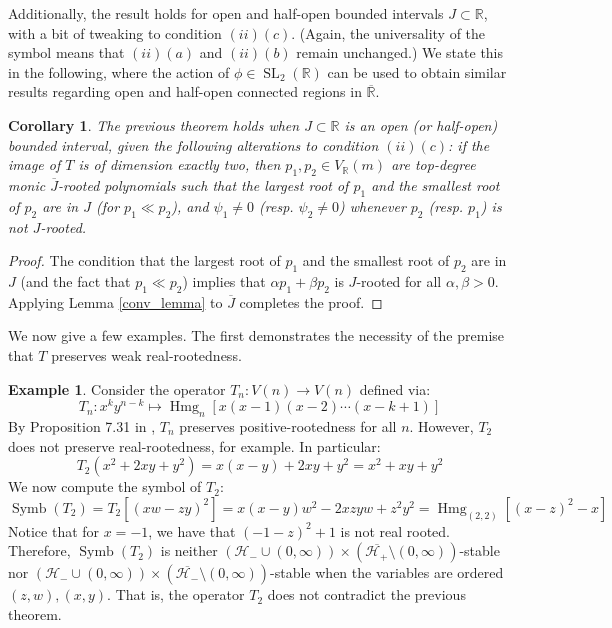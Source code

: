 \documentclass{article}
\newtheorem{corollary}[theorem]{Corollary}
\theoremstyle{definition}
\newtheorem{example}[theorem]{Example}
\theoremstyle{plain}
\newcommand{\R}{\mathbb{R}}
\newcommand{\UHP}{\mathcal{H}_+}
\newcommand{\LHP}{\mathcal{H}_-}
\DeclareMathOperator{\Hmg}{Hmg}
\DeclareMathOperator{\Symb}{Symb}
\DeclareMathOperator{\SL}{SL}
\begin{document}
Additionally, the result holds for open and half-open bounded intervals $J \subset \R$, with a bit of tweaking to condition $(ii)(c)$. (Again, the universality of the symbol means that $(ii)(a)$ and $(ii)(b)$ remain unchanged.) We state this in the following, where the action of $\phi \in \SL_2(\R)$ can be used to obtain similar results regarding open and half-open connected regions in $\overline{\R}$.

\begin{corollary}\label{Jops_graces_cor}
    The previous theorem holds when $J \subset \R$ is an open (or half-open) bounded interval, given the following alterations to condition $(ii)(c)$: if the image of $T$ is of dimension exactly two, then $p_1,p_2 \in V_\R(m)$ are top-degree monic $\overline{J}$-rooted polynomials such that the largest root of $p_1$ and the smallest root of $p_2$ are in $J$ (for $p_1 \ll p_2$), and $\psi_1 \neq 0$ (resp. $\psi_2 \neq 0$) whenever $p_2$ (resp. $p_1$) is not $J$-rooted.
\end{corollary}
\begin{proof}
    The condition that the largest root of $p_1$ and the smallest root of $p_2$ are in $J$ (and the fact that $p_1 \ll p_2$) implies that $\alpha p_1 + \beta p_2$ is $J$-rooted for all $\alpha,\beta > 0$. Applying Lemma \ref{conv_lemma} to $\overline{J}$ completes the proof.
\end{proof}

We now give a few examples. The first demonstrates the necessity of the premise that $T$ preserves weak real-rootedness.

\begin{example}
    Consider the operator $T_n: V(n) \to V(n)$ defined via:
    \[
        T_n: x^ky^{n-k} \mapsto \Hmg_n[x(x-1)(x-2)\cdots(x-k+1)]
    \]
    By Proposition 7.31 in \cite{fisk2006polys}, $T_n$ preserves positive-rootedness for all $n$. However, $T_2$ does not preserve real-rootedness, for example. In particular:
    \[
        T_2(x^2+2xy+y^2) = x(x-y) + 2xy + y^2 = x^2 + xy + y^2
    \]
    We now compute the symbol of $T_2$:
    \[
        \Symb(T_2) = T_2[(xw-zy)^2] = x(x-y)w^2 - 2xzyw + z^2y^2 = \Hmg_{(2,2)}[(x-z)^2 - x]
    \]
    Notice that for $x = -1$, we have that $(-1-z)^2 + 1$ is not real rooted. Therefore, $\Symb(T_2)$ is neither $(\LHP \cup (0,\infty)) \times (\overline{\UHP} \setminus (0,\infty))$-stable nor $(\LHP \cup (0,\infty)) \times (\overline{\LHP} \setminus (0,\infty))$-stable when the variables are ordered $(z,w),(x,y)$. That is, the operator $T_2$ does not contradict the previous theorem.
\end{example}
\end{document}
